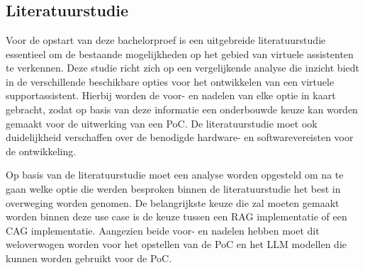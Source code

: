 
\chapter{}
\label{ch:methodologie}



\section{Literatuurstudie}

Voor de opstart van deze bachelorproef is een uitgebreide literatuurstudie essentieel om de bestaande mogelijkheden op het gebied van virtuele assistenten te verkennen. Deze studie richt zich op een vergelijkende analyse die inzicht biedt in de verschillende beschikbare opties voor het ontwikkelen van een virtuele supportassistent. Hierbij worden de voor- en nadelen van elke optie in kaart gebracht, zodat op basis van deze informatie een onderbouwde keuze kan worden gemaakt voor de uitwerking van een PoC. De literatuurstudie moet ook duidelijkheid verschaffen over de benodigde hardware- en softwarevereisten voor de ontwikkeling.

Op basis van de literatuurstudie moet een analyse worden opgesteld om na te gaan welke optie die werden besproken binnen de literatuurstudie het best in overweging worden genomen. De belangrijkste keuze die zal moeten gemaakt worden binnen deze use case is de keuze tussen een RAG implementatie of een CAG implementatie. Aangezien beide voor- en nadelen hebben moet dit weloverwogen worden voor het opstellen van de PoC en het LLM modellen die kunnen worden gebruikt voor de PoC.


